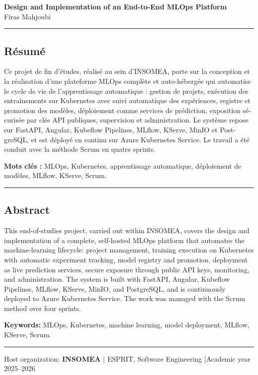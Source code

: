 \clearpage
\thispagestyle{empty}
\vspace*{0.5cm}

\begin{center}
{\large\bfseries\color{primary} Design and Implementation of an End-to-End MLOps
Platform}\\[0.2cm]
{\normalsize Firas Mahjoubi}
\end{center}

\vspace{0.8cm}
\noindent\rule{\textwidth}{0.8pt}
\begin{otherlanguage}{french}
\subsection*{R\'esum\'e}
Ce projet de fin d'\'etudes, r\'ealis\'e au sein d'INSOMEA, porte sur la conception
et la r\'ealisation d'une plateforme MLOps compl\`ete et auto-h\'eberg\'ee qui
automatise le cycle de vie de l'apprentissage automatique : gestion de projets,
ex\'ecution des entra\^inements sur Kubernetes avec suivi automatique des
exp\'eriences, registre et promotion des mod\`eles, d\'eploiement comme services
de pr\'ediction, exposition s\'ecuris\'ee par cl\'es API publiques, supervision et
administration. Le syst\`eme repose sur FastAPI, Angular, Kubeflow Pipelines,
MLflow, KServe, MinIO et PostgreSQL, et est d\'eploy\'e en continu sur Azure
Kubernetes Service. Le travail a \'et\'e conduit avec la m\'ethode Scrum en quatre
sprints.

\noindent\textbf{Mots cl\'es :} MLOps, Kubernetes, apprentissage automatique,
d\'eploiement de mod\`eles, MLflow, KServe, Scrum.
\end{otherlanguage}

\noindent\rule{\textwidth}{0.8pt}
\subsection*{Abstract}
This end-of-studies project, carried out within INSOMEA, covers the design and
implementation of a complete, self-hosted MLOps platform that automates the
machine-learning lifecycle: project management, training execution on Kubernetes
with automatic experiment tracking, model registry and promotion, deployment as
live prediction services, secure exposure through public API keys, monitoring,
and administration. The system is built with FastAPI, Angular, Kubeflow
Pipelines, MLflow, KServe, MinIO, and PostgreSQL, and is continuously deployed to
Azure Kubernetes Service. The work was managed with the Scrum method over four
sprints.

\noindent\textbf{Keywords:} MLOps, Kubernetes, machine learning, model
deployment, MLflow, KServe, Scrum.

\noindent\rule{\textwidth}{0.8pt}
\begin{center}
{\small Host organization: \textbf{INSOMEA} \quad|\quad
ESPRIT, Software Engineering \quad|\quad Academic year 2025--2026}
\end{center}
